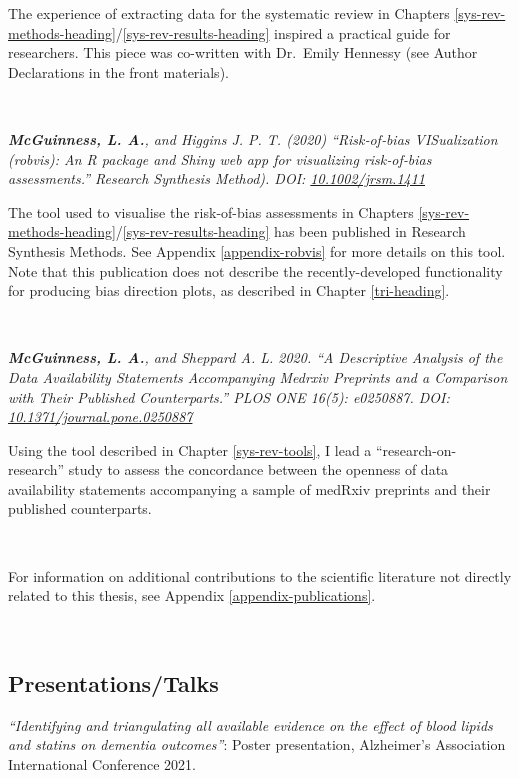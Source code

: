 \documentclass[a4paper, twoside]{templates/ociamthesis}
\begin{document}
The experience of extracting data for the systematic review in Chapters \ref{sys-rev-methods-heading}/\ref{sys-rev-results-heading} inspired a practical guide for researchers. This piece was co-written with Dr.~Emily Hennessy (see Author Declarations in the front materials).

~

\emph{\textbf{McGuinness, L. A.}, and Higgins J. P. T. (2020) ``Risk‐of‐bias VISualization (robvis): An R package and Shiny web app for visualizing risk‐of‐bias assessments.'' Research Synthesis Method). DOI: \href{https://doi.org/10.1002/jrsm.1411}{10.1002/jrsm.1411}}

The tool used to visualise the risk-of-bias assessments in Chapters \ref{sys-rev-methods-heading}/\ref{sys-rev-results-heading} has been published in Research Synthesis Methods. See Appendix \ref{appendix-robvis} for more details on this tool. Note that this publication does not describe the recently-developed functionality for producing bias direction plots, as described in Chapter \ref{tri-heading}.

~

\emph{\textbf{McGuinness, L. A.}, and Sheppard A. L. 2020. ``A Descriptive Analysis of the Data Availability Statements Accompanying Medrxiv Preprints and a Comparison with Their Published Counterparts.'' PLOS ONE 16(5): e0250887. DOI: \href{https://doi.org/10.1371/journal.pone.0250887}{10.1371/journal.pone.0250887}}

Using the tool described in Chapter \ref{sys-rev-tools}, I lead a ``research-on-research'' study to assess the concordance between the openness of data availability statements accompanying a sample of medRxiv preprints and their published counterparts.

~

For information on additional contributions to the scientific literature not directly related to this thesis, see Appendix \ref{appendix-publications}.

~

\hypertarget{presentationstalks}{%
\subsection{Presentations/Talks}\label{presentationstalks}}

\emph{``Identifying and triangulating all available evidence on the effect of blood lipids and statins on dementia outcomes''}: Poster presentation, Alzheimer's Association International Conference 2021.
\end{document}
